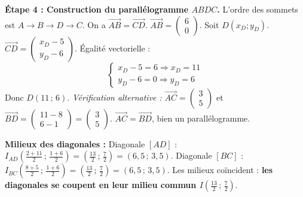 \documentclass[11pt]{article}
\begin{document}
\begin{exoresolu}
\textbf{Étape 4 : Construction du parallélogramme $ABDC$.}
L'ordre des sommets est $A \to B \to D \to C$. On a $\vec{AB} = \vec{CD}$.
$\vec{AB} = \begin{pmatrix} 6 \\ 0 \end{pmatrix}$. Soit $D(x_D;y_D)$. $\vec{CD} = \begin{pmatrix} x_D-5 \\ y_D-6 \end{pmatrix}$.
Égalité vectorielle :
\[
\begin{cases}
x_D - 5 = 6 \Rightarrow x_D = 11\\
y_D - 6 = 0 \Rightarrow y_D = 6
\end{cases}
\]
Donc \textbf{$D(11\,;\,6)$}.
\textit{Vérification alternative :} $\vec{AC} = \begin{pmatrix} 3 \\ 5 \end{pmatrix}$ et $\vec{BD} = \begin{pmatrix} 11-8 \\ 6-1 \end{pmatrix} = \begin{pmatrix} 3 \\ 5 \end{pmatrix}$. $\vec{AC} = \vec{BD}$, bien un parallélogramme.

\textbf{Milieux des diagonales :}
Diagonale $[AD]$ : $I_{AD}\left(\frac{2+11}{2}\,;\,\frac{1+6}{2}\right) = \left(\frac{13}{2}\,;\,\frac{7}{2}\right) = (6,5\,;\,3,5)$.
Diagonale $[BC]$ : $I_{BC}\left(\frac{8+5}{2}\,;\,\frac{1+6}{2}\right) = \left(\frac{13}{2}\,;\,\frac{7}{2}\right) = (6,5\,;\,3,5)$.
Les milieux coïncident : \textbf{les diagonales se coupent en leur milieu commun $I\left(\frac{13}{2}\,;\,\frac{7}{2}\right)$}.


\end{exoresolu}
\end{document}
